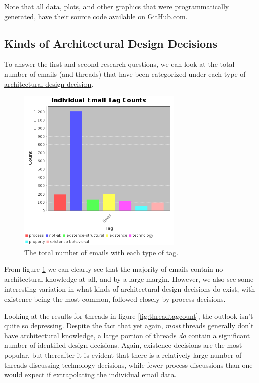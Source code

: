 \documentclass[a4paper, 12pt]{article}
\begin{document}
	\footnotesize
	Note that all data, plots, and other graphics that were programmatically generated, have their \href{https://github.com/ArchitecturalKnowledgeAnalysis/EmailDatasetReportGen}{source code available on GitHub.com}.
	\normalsize
	
	\subsection{Kinds of Architectural Design Decisions}
		To answer the first and second research questions, we can look at the total number of emails (and threads) that have been categorized under each type of \hyperref[sec:design-decisions]{architectural design decision}.
		
		\begin{figure}[H]
			\centering
			\includegraphics[width=0.7\textwidth]{report/overview/individual_email_tag_count.png}
			\caption{The total number of emails with each type of tag.}
			\label{fig:emailtagcount}
		\end{figure}
	
		From figure \ref{fig:emailtagcount} we can clearly see that the majority of emails contain no architectural knowledge at all, and by a large margin. However, we also see some interesting variation in what kinds of architectural design decisions do exist, with existence being the most common, followed closely by process decisions.
	
		Looking at the results for threads in figure \ref{fig:threadtagcount}, the outlook isn't quite so depressing. Despite the fact that yet again, \textit{most} threads generally don't have architectural knowledge, a large portion of threads \textit{do} contain a significant number of identified design decisions. Again, existence decisions are the most popular, but thereafter it is evident that there is a relatively large number of threads discussing technology decisions, while fewer process discussions than one would expect if extrapolating the individual email data.
	
\end{document}
